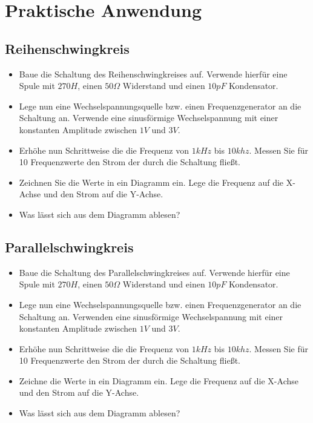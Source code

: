 \section{Praktische Anwendung}

\subsection*{Reihenschwingkreis}

\begin{itemize}
\itemsep1pt\parskip0pt
\item Baue die Schaltung des Reihenschwingkreises auf. Verwende hierfür eine Spule mit $270H$, einen $50\Omega$ Widerstand und einen $10pF$ Kondensator. 
\item Lege nun eine Wechselspannungsquelle bzw. einen Frequenzgenerator an die Schaltung an. Verwende eine sinusförmige Wechselspannung mit einer konstanten Amplitude zwischen $1V$ und $3V$.
\item Erhöhe nun Schrittweise die die Frequenz von $1kHz$ bis $10khz$. Messen Sie für 10 Frequenzwerte den Strom der durch die Schaltung fließt.
\item Zeichnen Sie die Werte in ein Diagramm ein. Lege die Frequenz auf die X-Achse und den Strom auf die Y-Achse.
\item Was lässt sich aus dem Diagramm ablesen?
\end{itemize}


\subsection*{Parallelschwingkreis}

\begin{itemize}
\itemsep1pt\parskip0pt
\item Baue die Schaltung des Parallelschwingkreises auf. Verwende hierfür eine Spule mit $270H$, einen $50\Omega$ Widerstand und einen $10pF$ Kondensator. 
\item Lege nun eine Wechselspannungsquelle bzw. einen Frequenzgenerator an die Schaltung an. Verwenden eine sinusförmige Wechselspannung mit einer konstanten Amplitude zwischen $1V$ und $3V$.
\item Erhöhe nun Schrittweise die die Frequenz von $1kHz$ bis $10khz$. Messen Sie für 10 Frequenzwerte den Strom der durch die Schaltung fließt.
\item Zeichne die Werte in ein Diagramm ein. Lege die Frequenz auf die X-Achse und den Strom auf die Y-Achse.
\item Was lässt sich aus dem Diagramm ablesen?
\end{itemize}

